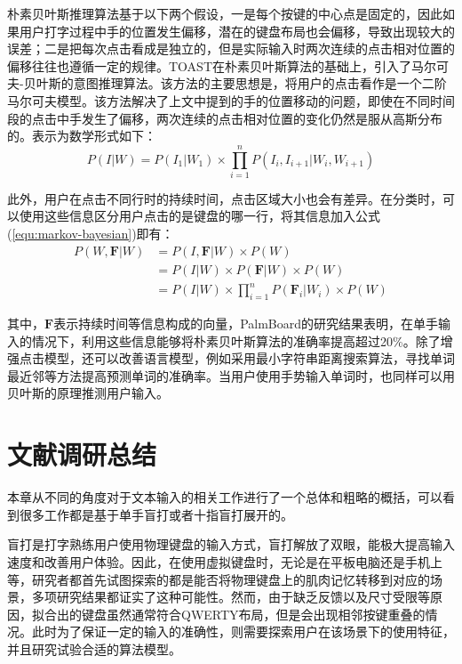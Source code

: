 朴素贝叶斯推理算法基于以下两个假设，一是每个按键的中心点是固定的，因此如果用户打字过程中手的位置发生偏移，潜在的键盘布局也会偏移，导致出现较大的误差；二是把每次点击看成是独立的，但是实际输入时两次连续的点击相对位置的偏移往往也遵循一定的规律\cite{2018shitoast}。TOAST\cite{2018shitoast}在朴素贝叶斯算法的基础上，引入了马尔可夫-贝叶斯的意图推理算法。该方法的主要思想是，将用户的点击看作是一个二阶马尔可夫模型。该方法解决了上文中提到的手的位置移动的问题，即使在不同时间段的点击中手发生了偏移，两次连续的点击相对位置的变化仍然是服从高斯分布的。表示为数学形式如下：
\begin{equation}
    \label{equ:markov-bayesian}
    P(I|W) = P(I_1|W_1) \times \prod_{i=1}^{n}P(I_i, I_{i+1}|W_i, W_{i+1})
\end{equation}

此外，用户在点击不同行时的持续时间，点击区域大小也会有差异。在分类时，可以使用这些信息区分用户点击的是键盘的哪一行，将其信息加入公式(\ref{equ:markov-bayesian})即有：
\begin{equation}
    \begin{aligned}
        P(W, \textbf{F}|W) &= P(I,\textbf{F}|W) \times P(W) \\ 
        &= P(I|W) \times P(\textbf{F}|W) \times P(W) \\ &= P(I|W) \times \prod_{i=1}^{n}P(\textbf{F}_{i}|W_{i}) \times P(W)
    \end{aligned} 
\end{equation}

其中，$\textbf{F}$表示持续时间等信息构成的向量，PalmBoard\cite{palmboard2020}的研究结果表明，在单手输入的情况下，利用这些信息能够将朴素贝叶斯算法的准确率提高超过20\%。除了增强点击模型，还可以改善语言模型，例如采用最小字符串距离搜索算法\cite{tinwala2010eyes}，寻找单词最近邻\cite{bunke1993fast}等方法提高预测单词的准确率。当用户使用手势输入单词时，也同样可以用贝叶斯的原理推测用户输入\cite{zhai2012word}。

\section{文献调研总结}
本章从不同的角度对于文本输入的相关工作进行了一个总体和粗略的概括，可以看到很多工作都是基于单手盲打或者十指盲打展开的。

盲打是打字熟练用户使用物理键盘的输入方式，盲打解放了双眼，能极大提高输入速度和改善用户体验。因此，在使用虚拟键盘时，无论是在平板电脑还是手机上等，研究者都首先试图探索的都是能否将物理键盘上的肌肉记忆转移到对应的场景，多项研究结果都证实了这种可能性\cite{2017blindtype}\cite{2018shitoast}\cite{zhu2018typing}\cite{palmboard2020}。然而，由于缺乏反馈以及尺寸受限等原因，拟合出的键盘虽然通常符合QWERTY布局，但是会出现相邻按键重叠的情况。此时为了保证一定的输入的准确性，则需要探索用户在该场景下的使用特征，并且研究试验合适的算法模型。

